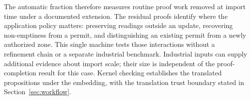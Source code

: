 The automatic fraction therefore measures routine proof work removed at
import time under a documented extension. The residual proofs identify
where the application policy matters: preserving readings outside an
update, recovering non-emptiness from a permit, and distinguishing an
existing permit from a newly authorized zone. This single machine tests
those interactions without a refinement chain or a separate industrial
benchmark. Industrial inputs can supply additional evidence about import
scale; their size is independent of the proof-completion result for this
case. Kernel checking establishes the translated propositions under the
embedding, with the translation trust boundary stated in
Section~\ref{sec:workflow}.
